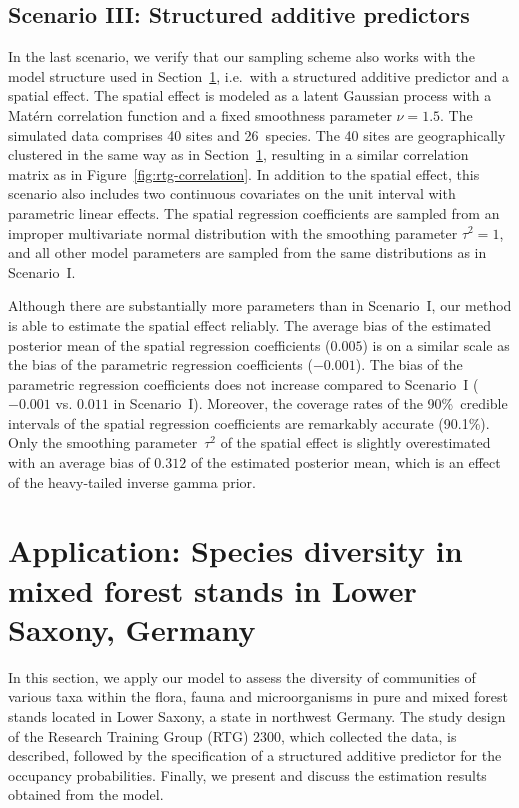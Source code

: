 \documentclass{article}
\begin{document}
\subsection{Scenario III: Structured additive predictors}

In the last scenario, we verify that our sampling scheme also works with the model structure used in Section~\ref{sec:application}, i.e.~with a structured additive predictor and a spatial effect. The spatial effect is modeled as a latent Gaussian process with a Matérn correlation function and a fixed smoothness parameter $\nu = 1.5$. The simulated data comprises 40 sites and 26~species. The 40 sites are geographically clustered in the same way as in Section~\ref{sec:application}, resulting in a similar correlation matrix as in Figure~\ref{fig:rtg-correlation}. In addition to the spatial effect, this scenario also includes two continuous covariates on the unit interval with parametric linear effects. The spatial regression coefficients are sampled from an improper multivariate normal distribution with the smoothing parameter $\tau^2 = 1$, and all other model parameters are sampled from the same distributions as in Scenario~I.

Although there are substantially more parameters than in Scenario~I, our method is able to estimate the spatial effect reliably. The average bias of the estimated posterior mean of the spatial regression coefficients ($0.005$) is on a similar scale as the bias of the parametric regression coefficients ($-0.001$). The bias of the parametric regression coefficients does not increase compared to Scenario~I ($-0.001$ vs. $0.011$ in Scenario~I). Moreover, the coverage rates of the 90\%~credible intervals of the spatial regression coefficients are remarkably accurate (90.1\%). Only the smoothing parameter~$\tau^2$ of the spatial effect is slightly overestimated with an average bias of $0.312$ of the estimated posterior mean, which is an effect of the heavy-tailed inverse gamma prior.

\section{Application: Species diversity in mixed forest stands in Lower Saxony, Germany}
\label{sec:application}

In this section, we apply our model to assess the diversity of communities of various taxa within the flora, fauna and microorganisms in pure and mixed forest stands located in Lower Saxony, a state in northwest Germany. The study design of the Research Training Group (RTG) 2300, which collected the data, is described, followed by the specification of a structured additive predictor for the occupancy probabilities. Finally, we present and discuss the estimation results obtained from the model.
\end{document}
